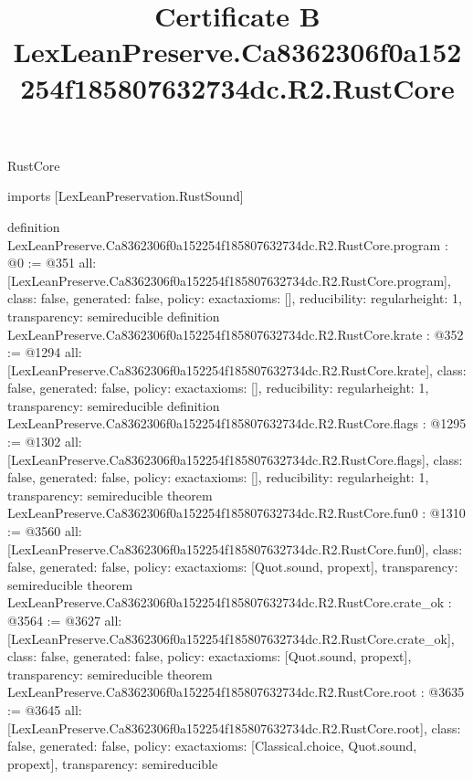 \begin{lexlean}{RustCore}
\title{Certificate B LexLeanPreserve.Ca8362306f0a152254f185807632734dc.R2.RustCore}
\begin{coremodule}
imports [LexLeanPreservation.RustSound]

definition LexLeanPreserve.Ca8362306f0a152254f185807632734dc.R2.RustCore.program : @0 := @351 {
  all: [LexLeanPreserve.Ca8362306f0a152254f185807632734dc.R2.RustCore.program],
  class: false,
  generated: false,
  policy: exact{axioms: []},
  reducibility: regular{height: 1},
  transparency: semireducible
}
definition LexLeanPreserve.Ca8362306f0a152254f185807632734dc.R2.RustCore.krate : @352 := @1294 {
  all: [LexLeanPreserve.Ca8362306f0a152254f185807632734dc.R2.RustCore.krate],
  class: false,
  generated: false,
  policy: exact{axioms: []},
  reducibility: regular{height: 1},
  transparency: semireducible
}
definition LexLeanPreserve.Ca8362306f0a152254f185807632734dc.R2.RustCore.flags : @1295 := @1302 {
  all: [LexLeanPreserve.Ca8362306f0a152254f185807632734dc.R2.RustCore.flags],
  class: false,
  generated: false,
  policy: exact{axioms: []},
  reducibility: regular{height: 1},
  transparency: semireducible
}
theorem LexLeanPreserve.Ca8362306f0a152254f185807632734dc.R2.RustCore.fun0 : @1310 := @3560 {
  all: [LexLeanPreserve.Ca8362306f0a152254f185807632734dc.R2.RustCore.fun0],
  class: false,
  generated: false,
  policy: exact{axioms: [Quot.sound, propext]},
  transparency: semireducible
}
theorem LexLeanPreserve.Ca8362306f0a152254f185807632734dc.R2.RustCore.crate_ok : @3564 := @3627 {
  all: [LexLeanPreserve.Ca8362306f0a152254f185807632734dc.R2.RustCore.crate_ok],
  class: false,
  generated: false,
  policy: exact{axioms: [Quot.sound, propext]},
  transparency: semireducible
}
theorem LexLeanPreserve.Ca8362306f0a152254f185807632734dc.R2.RustCore.root : @3635 := @3645 {
  all: [LexLeanPreserve.Ca8362306f0a152254f185807632734dc.R2.RustCore.root],
  class: false,
  generated: false,
  policy: exact{axioms: [Classical.choice, Quot.sound, propext]},
  transparency: semireducible
}


\end{coremodule}
\end{lexlean}
